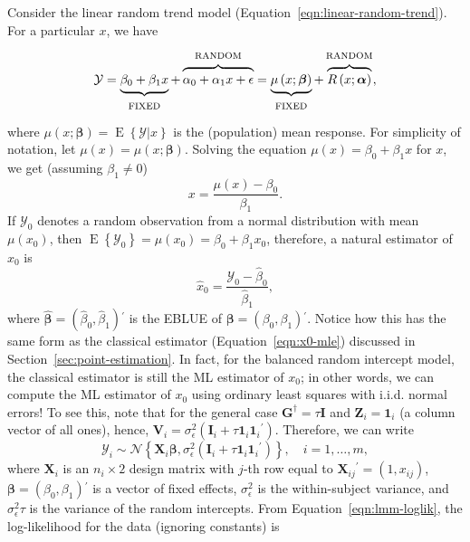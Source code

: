 \documentclass[cmfont,usenames,dvipsnames,leqno]{afit-etd}\usepackage[]{graphicx}\usepackage[]{color}
\newcommand{\trans}{\ensuremath{^\prime}}
\newcommand{\bc}[1]{\ensuremath{\bm{\mathcal{#1}}}}
\newcommand{\mc}[1]{\ensuremath{\mathcal{#1}}}
\newcommand{\wh}[1]{\ensuremath{\widehat{#1}}}
\newcommand{\E}{\operatorname{E}}
\newcommand{\X}{\ensuremath{\bm{X}}}
\newcommand{\Z}{\ensuremath{\bm{Z}}}
\begin{document}
Consider the linear random trend model (Equation~\eqref{eqn:linear-random-trend}). For a particular $x$, we have
\begin{equation*}
  \mc{Y} = \underbrace{\strut \beta_0 + \beta_1 x}_\text{\strut FIXED} + \overbrace{\strut \alpha_0 + \alpha_1 x + \epsilon}^\text{\strut RANDOM} = \underbrace{\strut \mu\left(x; \bm{\beta}\right)}_\text{\strut FIXED} + \overbrace{\strut R\left(x; \bm{\alpha}\right)}^\text{\strut RANDOM},
\end{equation*}
where $\mu\left(x; \bm{\beta}\right) = \E\left\{\mc{Y}|x\right\}$ is the (population) mean response. For simplicity of notation, let $\mu\left(x\right) = \mu\left(x; \bm{\beta}\right)$. Solving the equation $\mu(x) = \beta_0 + \beta_1 x$ for $x$, we get (assuming $
\beta_1 \ne 0$)
\begin{equation*}
  x = \frac{\mu(x) - \beta_0}{\beta_1}.
\end{equation*}
If $\mc{Y}_0$ denotes a random observation from a normal distribution with mean $\mu(x_0)$, then $\E\left\{\mc{Y}_0\right\} = \mu(x_0) = \beta_0 + \beta_1 x_0$, therefore, a natural estimator of $x_0$ is
\begin{equation}
\label{eqn:calibration-lmm-mle}
  \wh{x}_0 = \frac{\mc{Y}_0 - \wh{\beta}_0}{\wh{\beta}_1},
\end{equation}
where $\wh{\bm{\beta}} = \left(\wh{\beta}_0, \wh{\beta}_1\right)\trans$ is the EBLUE of $\bm{\beta} = \left(\beta_0, \beta_1\right)\trans$. Notice how this has the same form as the classical estimator (Equation~\eqref{eqn:x0-mle}) discussed in Section~\ref{sec:point-estimation}. In fact, for the balanced random intercept model, the classical estimator is still the ML estimator of $x_0$; in other words, we can compute the ML estimator of $x_0$ using ordinary least squares with i.i.d. normal errors! To see this, note that for the general case $\bm{G}^\dagger = \tau\bm{I}$ and $\Z_i = \bm{1}_i$ (a column vector of all ones), hence, $\bm{V}_i = \sigma_\epsilon^2\left(\bm{I}_i + \tau\bm{1}_i\bm{1}_i\trans\right)$. Therefore, we can write
\begin{equation*}
  \bc{Y}_i \sim \mc{N}\left\{\X_i\bm{\beta}, \sigma_\epsilon^2\left(\bm{I}_i + \tau\bm{1}_i\bm{1}_i\trans\right)\right\}, \quad i = 1, \dotsc, m,
\end{equation*}
where $\X_i$ is an $n_i \times 2$ design matrix with $j$-th row equal to $\X_{ij}\trans = \left(1, x_{ij}\right)$, $\bm{\beta} = \left(\beta_0, \beta_1\right)\trans$ is a vector of fixed effects, $\sigma_\epsilon^2$ is the within-subject variance, and $\sigma_\epsilon^2\tau$ is the variance of the random intercepts. From Equation~\ref{eqn:lmm-loglik}, the log-likelihood for the data (ignoring constants) is
\end{document}
